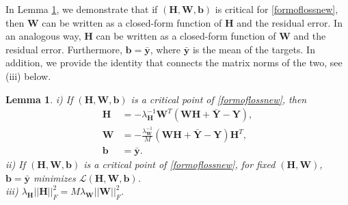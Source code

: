 \documentclass{article}
\theoremstyle{plain}
\newtheorem{lemma}[theorem]{Lemma}
\theoremstyle{definition}
\theoremstyle{remark}
\newcommand{\bW}{{\mathbf W}}
\newcommand{\bY}{{\mathbf Y}}
\newcommand{\bH}{{\mathbf H}}
\newcommand{\byb}{{\bar{\mathbf y}}}
\newcommand{\bYb}{{\bar{\mathbf Y}}}
\newcommand{\bb}{{\mathbf b}}
\newcommand{\lH}{\lambda_{\bH}}
\newcommand{\lW}{\lambda_{\bW}}
\begin{document}
In Lemma \ref{suppmat1}, we demonstrate that if $(\bH, \bW, \bb)$ is critical for \eqref{formoflossnew},  then $\bW$ can be written as a closed-form function of $\bH$ and the residual error. In an analogous way, $\bH$ can be written as a closed-form function of $\bW$ and the residual error. Furthermore, $\bb=\byb$, where $\byb$ is the mean of the targets. In addition, we provide the identity that connects the matrix norms of the two, see (iii) below.
\begin{lemma} \label{suppmat1}
i) If $(\bH, \bW, \bb)$ is a critical point of \eqref{formoflossnew}, then
\begin{align*}
    \bH &= - \lH^{-1} \bW^{T} (\bW \bH+\bYb-\bY),
    \\
    \bW &= -\frac{\lW^{-1}}{M} (\bW\bH+\bYb-\bY) \bH^{T},
    \\
    \bb &= \byb.
\end{align*}
ii) If $(\bH, \bW, \bb)$ is a critical point of \eqref{formoflossnew}, for fixed $(\bH, \bW)$, $\bb=\byb$ minimizes $\mathcal{L}(\bH, \bW, \bb)$.
\\
iii) $\lH ||\bH||_F^2=M \lW ||\bW||_F^2$.
\end{lemma}
\end{document}
